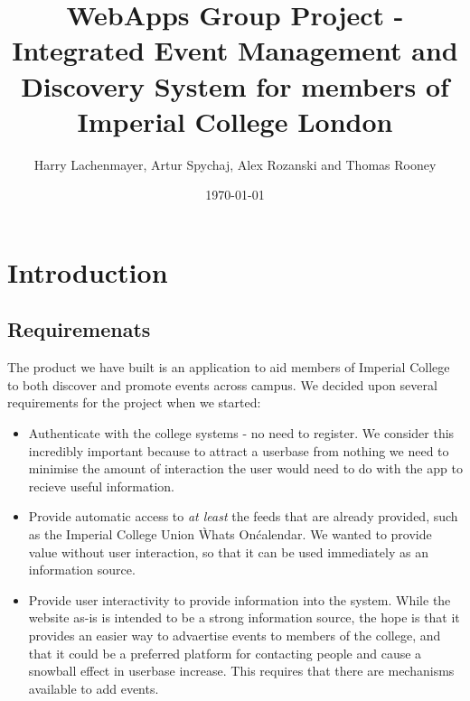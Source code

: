 \documentclass[11pt]{article}
\begin{document}
\title{WebApps Group Project - Integrated Event Management and Discovery System for members of Imperial College London}

\author{Harry Lachenmayer, Artur Spychaj, Alex Rozanski and Thomas Rooney}

\date{\today}         %

\maketitle            %

\section {Introduction}

\subsection {Requiremenats}

The product we have built is an application to aid members of Imperial College to both discover and promote events across campus. We decided upon several requirements for the project when we started:

\begin{itemize}
\item Authenticate with the college systems - no need to register. We consider this incredibly important because to attract a userbase from nothing we need to minimise the amount of interaction the user would need to do with the app to recieve useful information.

\item Provide automatic access to \textit{at least} the feeds that are already provided, such as the Imperial College Union \`Whats On\' calendar. We wanted to provide value without user interaction, so that it can be used immediately as an information source.

\item Provide user interactivity to provide information into the system. While the website as-is is intended to be a strong information source, the hope is that it provides an easier way to advaertise events to members of the college, and that it could be a preferred platform for contacting people and cause a snowball effect in userbase increase. This requires that there are mechanisms available to add events.
\end{itemize}
\end{document}
